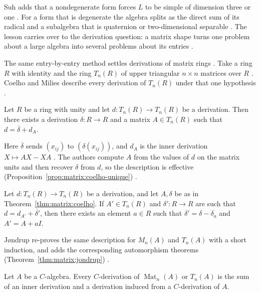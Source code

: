 Suh adds that a nondegenerate form forces $L$ to be simple of dimension three
or one \cite[Corollary, p.~257]{Suh1969}. For a form that is degenerate the
algebra splits as the direct sum of its radical and a subalgebra that is
quaternion or two-dimensional separable \cite[p.~255]{Suh1969}. The lesson
carries over to the derivation question: a matrix shape turns one problem
about a large algebra into several problems about its entries
\cite[p.~255]{Suh1969}.

The same entry-by-entry method settles derivations of matrix rings
\cite[p.~263]{CoelhoMilies1993}. Take a ring $R$ with identity and the ring
$T_n(R)$ of upper triangular $n\times n$ matrices over $R$
\cite[p.~263]{CoelhoMilies1993}. Coelho and Milies describe every derivation
of $T_n(R)$ under that one hypothesis \cite[p.~263]{CoelhoMilies1993}.

\begin{theorem}\label{thm:matrix:coelho}
Let $R$ be a ring with unity and let $d\colon T_n(R)\to T_n(R)$ be a
derivation. Then there exists a derivation $\delta\colon R\to R$ and a matrix
$A\in T_n(R)$ such that $d=\overline{\delta}+d_A$.
\end{theorem}

Here $\overline{\delta}$ sends $(x_{ij})$ to $(\delta(x_{ij}))$, and $d_A$ is
the inner derivation $X\mapsto AX-XA$ \cite[p.~263]{CoelhoMilies1993}. The
authors compute $A$ from the values of $d$ on the matrix units and then recover
$\delta$ from $d$, so the description is effective (Proposition~\ref{prop:matrix:coelho-unique})
\cite[p.~264]{CoelhoMilies1993}.\begin{proposition}\label{prop:matrix:coelho-unique}
Let $d\colon T_n(R)\to T_n(R)$ be a derivation, and let $A,\delta$ be as in
Theorem~\ref{thm:matrix:coelho}. If $A'\in T_n(R)$ and
$\delta'\colon R\to R$ are such that $d=d_{A'}+\overline{\delta'}$, then there
exists an element $a\in R$ such that $\delta'=\delta-\delta_a$ and
$A'=A+aI$.
\end{proposition}

Jøndrup re-proves the same description for $M_n(A)$ and $T_n(A)$ with a short
induction, and adds the corresponding automorphism theorems (Theorem~\ref{thm:matrix:jondrup})
\cite[p.~205]{Jondrup1995}.\begin{theorem}\label{thm:matrix:jondrup}
Let $A$ be a $C$-algebra. Every $C$-derivation of $\operatorname{Mat}_n(A)$ or
$T_n(A)$ is the sum of an inner derivation and a derivation induced from a
$C$-derivation of $A$.
\end{theorem}

